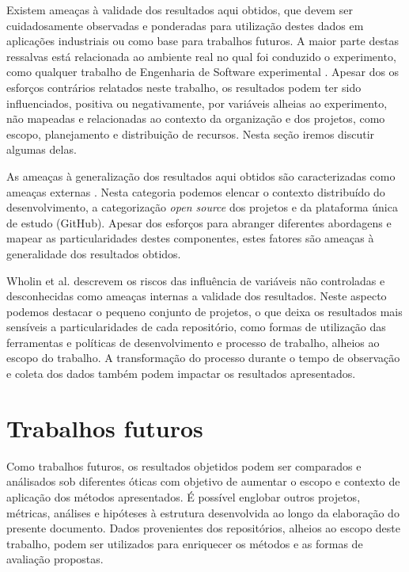 \documentclass[12pt,openany,oneside,a4paper,english,brazil]{abntbibufjf}
\begin{document}
  Existem ameaças à validade dos resultados aqui obtidos, que devem ser cuidadosamente observadas e ponderadas para utilização destes dados em aplicações industriais ou como base para trabalhos futuros. A maior parte destas ressalvas está relacionada ao ambiente real no qual foi conduzido o experimento, como qualquer trabalho de Engenharia de Software experimental \cite{Sjoberg2002}. Apesar dos os esforços contrários relatados neste trabalho, os resultados podem ter sido influenciados, positiva ou negativamente, por variáveis alheias ao experimento, não mapeadas e relacionadas ao contexto da organização e dos projetos, como escopo, planejamento e distribuição de recursos. Nesta seção iremos discutir algumas delas.

  As ameaças à generalização dos resultados aqui obtidos são caracterizadas como ameaças externas \cite{wohlin2012}. Nesta categoria podemos elencar o contexto distribuído do desenvolvimento, a categorização \textit{open source} dos projetos e da plataforma única de estudo (GitHub). Apesar dos esforços para abranger diferentes abordagens e mapear as particularidades destes componentes, estes fatores são ameaças à generalidade dos resultados obtidos.

  Wholin et al. \cite{wohlin2012} descrevem os riscos das influência de variáveis não controladas e desconhecidas como ameaças internas a validade dos resultados. Neste aspecto podemos destacar o pequeno conjunto de projetos,  o que deixa os resultados mais sensíveis a particularidades de cada repositório, como formas de utilização das ferramentas e políticas de desenvolvimento e processo de trabalho, alheios ao escopo do trabalho. A transformação do processo durante o tempo de observação e coleta dos dados também podem impactar os resultados apresentados.


  \section{Trabalhos futuros}\label{sec:trabalhos_futuros}
  Como trabalhos futuros, os resultados objetidos podem ser comparados e análisados sob diferentes óticas com objetivo de aumentar o escopo e contexto de aplicação dos métodos apresentados. É possível englobar outros projetos, métricas, análises e hipóteses à estrutura desenvolvida ao longo da elaboração do presente documento. Dados provenientes dos repositórios, alheios ao escopo deste trabalho, podem ser utilizados para enriquecer os métodos e as formas de avaliação propostas.
\end{document}
